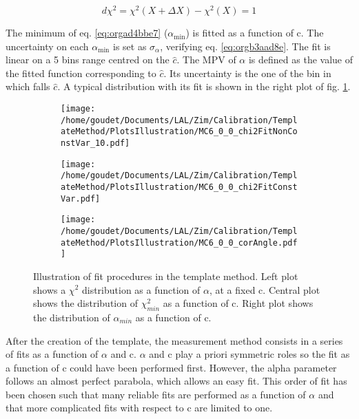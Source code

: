 \begin{equation}
\label{eq:orgb3aad8e}
d\chi^2 = \chi^2(X+\Delta X) - \chi^2(X) = 1
\end{equation}

The minimum of eq. \ref{eq:orgad4bbe7} (\(\alpha_{\text{min}}\)) is fitted as a function of c.
The uncertainty on each \(\alpha_{\text{min}}\) is set as \(\sigma_{\alpha}\), verifying eq. \ref{eq:orgb3aad8e}.
The fit is linear on a 5 bins range centred on the \(\hat{c}\).
The MPV of \(\alpha\) is defined as the value of the fitted function corresponding to \(\hat{c}\).
Its uncertainty is the one of the bin in which falls \(\hat{c}\).
A typical distribution with its fit is shown in the right plot of fig. \ref{orged35c4f}.

\begin{figure}
\begin{subfigure}[t]{0.32\linewidth}
\begin{center}
\texttt{[image: /home/goudet/Documents/LAL/Zim/Calibration/TemplateMethod/PlotsIllustration/MC6\_0\_0\_chi2FitNonConstVar\_10.pdf]}
\end{center}
\end{subfigure}
\begin{subfigure}[t]{0.32\linewidth}
\begin{center}
\texttt{[image: /home/goudet/Documents/LAL/Zim/Calibration/TemplateMethod/PlotsIllustration/MC6\_0\_0\_chi2FitConstVar.pdf]}
\end{center}
\end{subfigure}
\begin{subfigure}[t]{0.32\linewidth}
\begin{center}
\texttt{[image: /home/goudet/Documents/LAL/Zim/Calibration/TemplateMethod/PlotsIllustration/MC6\_0\_0\_corAngle.pdf]}
\end{center}
\end{subfigure}
\caption{\label{orged35c4f}
Illustration of fit procedures in the template method. Left plot shows a \(\chi^2\) distribution as a function of \(\alpha\), at a fixed c. Central plot shows the distribution of \(\chi_{min}^2\) as a function of c. Right plot shows the distribution of \(\alpha_{min}\) as a function of c.}
\end{figure}

After the creation of the template, the measurement method consists in a series of fits as a function of \(\alpha\) and c.
\(\alpha\) and c play a priori symmetric roles so the fit as a function of c could have been performed first.
However, the alpha parameter follows an almost perfect parabola, which allows an easy fit.
This order of fit has been chosen such that many reliable fits are performed as a function of \(\alpha\) and that more complicated fits with respect to c are limited to one.



